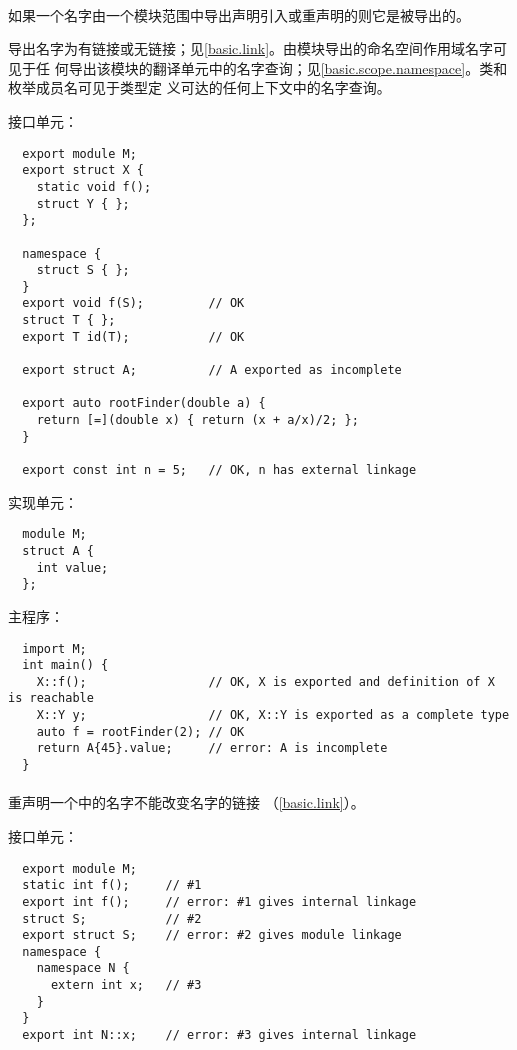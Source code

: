 \paragraph{} %
如果一个名字由一个模块范围中导出声明引入或重声明的则它是被导出的。

\begin{note}
  导出名字为有链接或无链接；见\ref{basic.link}。由模块导出的命名空间作用域名字可见于任
  何导出该模块的翻译单元中的名字查询；见\ref{basic.scope.namespace}。类和枚举成员名可见于类型定
  义可达的任何上下文中的名字查询。
\end{note}

\begin{example}

  接口单元：
  \begin{lstlisting}
  export module M;
  export struct X {
    static void f();
    struct Y { };
  };

  namespace {
    struct S { };
  }
  export void f(S);         // OK
  struct T { };
  export T id(T);           // OK

  export struct A;          // A exported as incomplete

  export auto rootFinder(double a) {
    return [=](double x) { return (x + a/x)/2; };
  }

  export const int n = 5;   // OK, n has external linkage
  \end{lstlisting}
  实现单元：
  \begin{lstlisting}
  module M;
  struct A {
    int value;
  };
  \end{lstlisting}
  主程序：
  \begin{lstlisting}
  import M;
  int main() {
    X::f();                 // OK, X is exported and definition of X is reachable
    X::Y y;                 // OK, X::Y is exported as a complete type
    auto f = rootFinder(2); // OK
    return A{45}.value;     // error: A is incomplete
  }
  \end{lstlisting}
\end{example}

\paragraph{} %
\begin{note}
  重声明一个中的名字不能改变名字的链接
  （\ref{basic.link}）。

  \begin{example}

    接口单元：
    \begin{lstlisting}
  export module M;
  static int f();     // #1
  export int f();     // error: #1 gives internal linkage
  struct S;           // #2
  export struct S;    // error: #2 gives module linkage
  namespace {
    namespace N {
      extern int x;   // #3
    }
  }
  export int N::x;    // error: #3 gives internal linkage
    \end{lstlisting}
  \end{example}
\end{note}

